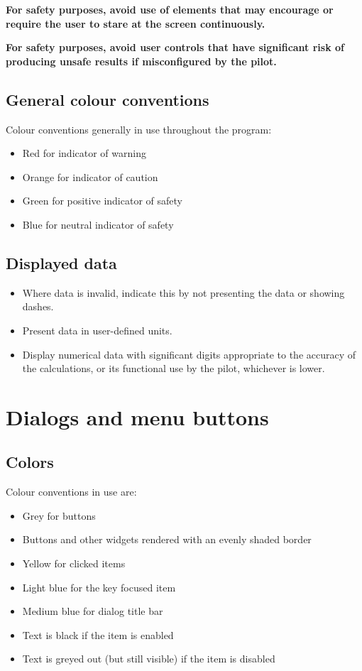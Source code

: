 \documentclass[a4paper,12pt]{refrep}
\begin{document}
{\bf For safety purposes, avoid use of elements that may encourage or require the user to stare at the screen continuously.}

{\bf For safety purposes, avoid user controls that have significant risk of producing unsafe results if misconfigured by the pilot.}

\subsection{General colour conventions}
Colour conventions generally in use throughout the program:
\begin{itemize}
\item Red for indicator of warning
\item Orange for indicator of caution
\item Green for positive indicator of safety
\item Blue for neutral indicator of safety
\end{itemize}

\subsection{Displayed data}
\begin{itemize}
\item Where data is invalid, indicate this by not presenting the data or
  showing dashes.
\item Present data in user-defined units.
\item Display numerical data with significant digits appropriate to the accuracy of the
  calculations, or its functional use by the pilot, whichever is lower.
\end{itemize}

\section{Dialogs and menu buttons}

\subsection{Colors}
Colour conventions in use are:
\begin{itemize}
\item Grey for buttons
\item Buttons and other widgets rendered with an evenly shaded border
\item Yellow for clicked items
\item Light blue for the key focused item
\item Medium blue for dialog title bar
\item Text is black if the item is enabled
\item Text is greyed out (but still visible) if the item is disabled
\end{itemize}
\end{document}
